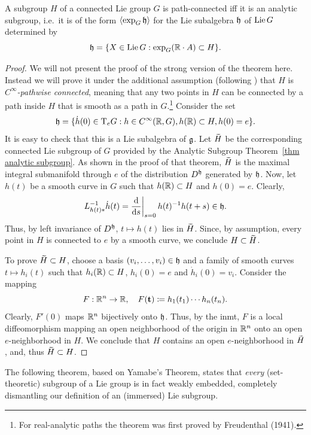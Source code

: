\begin{thm}\label{thm Yamabe}
    A subgroup $H$ of a connected Lie group $G$ is path-connected iff it is an analytic subgroup, i.e.~it is of the form $\langle\exp_G\mathfrak{h}\rangle$ for the Lie subalgebra $\mathfrak{h}$ of $\operatorname{Lie} G$ determined by
    \[\mathfrak{h}=\{X\in\operatorname{Lie} G: \exp_G(\mathbb{R}\cdot A)\subset H\}.\]
\end{thm}
\begin{proof}
    We will not present the proof of the strong version of the theorem here. Instead we will prove it under the additional assumption (following \cite[Lem.~1.7.10]{RS2}) that $H$ is \emph{$C^\infty$-pathwise connected}, meaning that any two points in $H$ can be connected by a path inside $H$ that is smooth as a path in $G$.\footnote{For real-analytic paths the theorem was first proved by Freudenthal (1941).} Consider the set
    \[\mathfrak{h}=\{\dot h(0)\in \mathrm{T}_eG: h\in C^\infty(\mathbb{R},G),h(\mathbb{R})\subset H,h(0)=e\}.\]
    It is easy to check that this is a Lie subalgebra of $\mathfrak{g}$. Let $\wt H$ be the corresponding connected Lie subgroup of $G$ provided by the Analytic Subgroup Theorem~\ref{thm analytic subgroup}. As shown in the proof of that theorem, $\wt H$ is the maximal integral submanifold through $e$ of the distribution $D^{\mathfrak{h}}$ generated by $\mathfrak{h}$. Now, let $h(t)$ be a smooth curve in $G$ such that $h(\mathbb{R})\subset H$ and $h(0)=e$. Clearly,
    \[L_{h(t)\ast}^{-1}\dot h(t)=\restr{\frac{\dd}{\dd s}}{s=0}h(t)^{-1}h(t+s)\in\frakh.\]
    Thus, by left invariance of $D^{\mathfrak{h}}$, $t\mapsto h(t)$ lies in $\wt H$. Since, by assumption, every point in $H$ is connected to $e$ by a smooth curve, we conclude $H\subset \wt H$.

    To prove $\wt H\subset H$, choose a basis $(v_i,\ldots,v_i)\in \mathfrak{h}$ and a family of smooth curves $t\mapsto h_i(t)$ such that $h_i(\mathbb{R})\subset H$, $h_i(0)=e$ and $\dot h_i(0)=v_i$. Consider the mapping
    \[F:\mathbb{R}^n\to \mathbb{R},\quad F(\mathbf{t})\coloneqq h_1(t_1)\cdots h_n(t_n).\]
    Clearly, $F'(0)$ maps $\mathbb{R}^n$ bijectively onto $\mathfrak{h}$. Thus, by the \gls{inmt}, $F$ is a local diffeomorphism mapping an open neighborhood of the origin in $\mathbb{R}^n$ onto an open $e$-neighborhood in $H$. We conclude that $H$ contains an open $e$-neighborhood in $\wt H$, and, thus $\wt H\subset H$.
\end{proof}

The following theorem, based on Yamabe's Theorem, states that \emph{every} (set-theoretic) subgroup of a Lie group is in fact weakly embedded, completely dismantling our definition of an (immersed) Lie subgroup.

